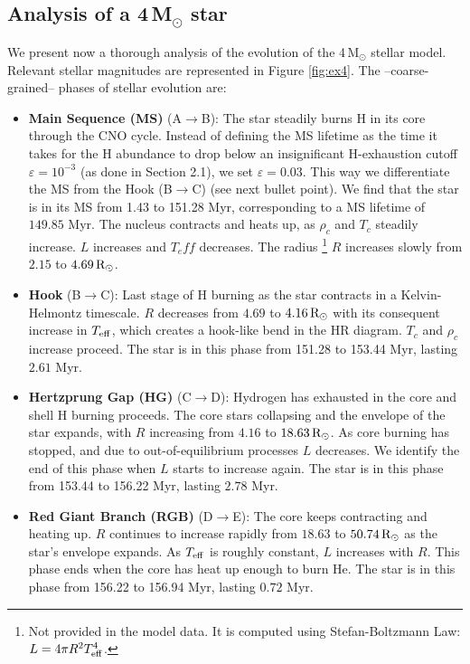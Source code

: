 \subsection{Analysis of a 4$\,$M$_\odot$ star}

We present now a thorough analysis of the evolution of the 4$\,$M$_\odot$ stellar model. Relevant stellar magnitudes are represented in Figure \ref{fig:ex4}. The --coarse-grained-- phases of stellar evolution are:
\begin{itemize}
    \item \textbf{Main Sequence (MS)} (A$\rightarrow$B): The star steadily burns H in its core through the CNO cycle. Instead of defining the MS lifetime as the time it takes for the H abundance to drop below an insignificant H-exhaustion cutoff $\varepsilon=10^{-3}$ (as done in Section 2.1), we set $\varepsilon=0.03$. This way we differentiate the MS from the Hook (B$\rightarrow$C) (see next bullet point). We find that the star is in its MS from 1.43 to 151.28 Myr, corresponding to a MS lifetime of $149.85$ Myr. The nucleus contracts and heats up, as $\rho_c$ and $T_c$ steadily increase. $L$ increases and $T_eff$ decreases. The radius \footnote{Not provided in the model data. It is computed using Stefan-Boltzmann Law: $L=4\pi R^2 T_{\rm eff}^4$.} $R$ increases slowly from $2.15$ to $4.69 \, {\rm R}_\odot$.
    \item \textbf{Hook} (B$\rightarrow$C): Last stage of H burning as the star contracts in a Kelvin-Helmontz timescale. $R$ decreases from $4.69$ to $4.16 \, {\rm R}_\odot$ with its consequent increase in $T_{\rm eff}$, which creates a hook-like bend in the HR diagram. $T_c$ and $\rho_c$ increase proceed. The star is in this phase from 151.28 to 153.44 Myr, lasting $2.61$ Myr.
    \item \textbf{Hertzprung Gap (HG)} (C$\rightarrow$D): Hydrogen has exhausted in the core and shell H burning proceeds. The core stars collapsing and the envelope of the star expands, with $R$ increasing from $4.16$ to $18.63 \, {\rm R}_\odot$. As core burning has stopped, and due to out-of-equilibrium processes $L$ decreases. We identify the end of this phase when $L$ starts to increase again. The star is in this phase from 153.44 to 156.22 Myr, lasting $2.78$ Myr.
    \item \textbf{Red Giant Branch (RGB)} (D$\rightarrow$E): The core keeps contracting and heating up. $R$ continues to increase rapidly from $18.63$ to $50.74 \, {\rm R}_\odot$ as the star's envelope expands. As $T_{\rm eff}$ is roughly constant, $L$ increases with $R$. This phase ends when the core has heat up enough to burn He. The star is in this phase from 156.22 to 156.94 Myr, lasting $0.72$ Myr.

\end{itemize}
